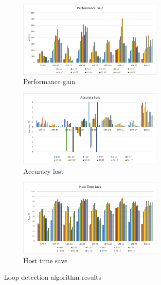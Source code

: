 \begin{figure}[H]
\centering
\begin{subfigure}{\textwidth}
    \centering
    \includegraphics[width=0.8\textwidth]{Images/Performance_REP.png}
    \caption{ Performance gain}
    \label{fig:Performance_ADAINCPCREP}
\end{subfigure}
\begin{subfigure}{\textwidth}
    \centering
    \includegraphics[width=0.8\textwidth]{Images/Accuracy_REP.png}
    \caption{ Accuracy lost}
    \label{fig:Accuracy_ADAINCPCREP}
\end{subfigure}
\begin{subfigure}{\textwidth}
    \centering
    \includegraphics[width=0.8\textwidth]{Images/Host_REP.png}
    \caption{ Host time save}
    \label{fig:Host_ADAINCPCREP}
\end{subfigure}
        
\caption{Loop detection algorithm results}
\label{fig:results_ADAINCPCREP}
\end{figure}

